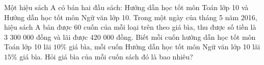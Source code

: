 \begin{ex}%
Một hiệu sách A có bán hai đầu sách: Hướng dẫn học tốt môn Toán lớp 10 và Hướng dẫn học tốt môn Ngữ văn lớp 10. Trong một ngày của tháng 5 năm 2016, hiệu sách A bán được $60$ cuốn của mỗi loại trên theo giá bìa, thu được số tiền là $3$ $300$ $000$ đồng và lãi được $420$ $000$ đồng. Biết mỗi cuốn hướng dẫn học tốt môn Toán lớp 10 lãi $10\%$ giá bìa, mỗi cuốn Hướng dẫn học tốt môn Ngữ văn lớp 10 lãi $15\%$ giá bìa. Hỏi giá bìa của mỗi cuốn sách đó là bao nhiêu?
\end{ex}

